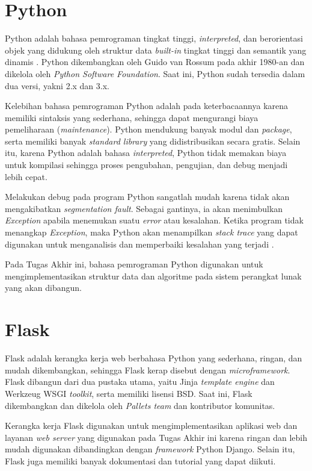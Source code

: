 \section{Python}
\tab Python adalah bahasa pemrograman tingkat tinggi, \textit{interpreted}, dan berorientasi objek yang didukung oleh struktur data \textit{built-in} tingkat tinggi dan semantik yang dinamis \cite{python}. Python dikembangkan oleh Guido van Rossum pada akhir 1980-an dan dikelola oleh \textit{Python Software Foundation}. Saat ini, Python sudah tersedia dalam dua versi, yakni 2.x dan 3.x.

Kelebihan bahasa pemrograman Python adalah pada keterbacaannya karena memiliki sintaksis yang sederhana, sehingga dapat mengurangi biaya pemeliharaan (\textit{maintenance}). Python mendukung banyak modul dan \textit{package}, serta memiliki banyak \textit{standard library} yang didistribusikan secara gratis. Selain itu, karena Python adalah bahasa \textit{interpreted}, Python tidak memakan biaya untuk kompilasi sehingga proses pengubahan, pengujian, dan debug menjadi lebih cepat.

Melakukan debug pada program Python sangatlah mudah karena tidak akan mengakibatkan \textit{segmentation fault}. Sebagai gantinya, ia akan menimbulkan \textit{Exception} apabila menemukan suatu \textit{error} atau kesalahan. Ketika program tidak menangkap \textit{Exception}, maka Python akan menampilkan \textit{stack trace} yang dapat digunakan untuk menganalisis dan memperbaiki kesalahan yang terjadi \cite{python}.

Pada Tugas Akhir ini, bahasa pemrograman Python digunakan untuk mengimplementasikan struktur data dan algoritme pada sistem perangkat lunak yang akan dibangun. 

\section{Flask}
\tab Flask adalah kerangka kerja web berbahasa Python yang sederhana, ringan, dan mudah dikembangkan, sehingga Flask kerap disebut dengan \textit{microframework}. Flask dibangun dari dua pustaka utama, yaitu Jinja \textit{template engine} dan Werkzeug WSGI \textit{toolkit}, serta memiliki lisensi BSD. Saat ini, Flask dikembangkan dan dikelola oleh \textit{Pallets team} dan kontributor komunitas.

Kerangka kerja Flask digunakan untuk mengimplementasikan aplikasi web dan layanan \textit{web server} yang digunakan pada Tugas Akhir ini karena ringan dan lebih mudah digunakan dibandingkan dengan \textit{framework} Python Django. Selain itu, Flask juga memiliki banyak dokumentasi dan tutorial yang dapat diikuti.
